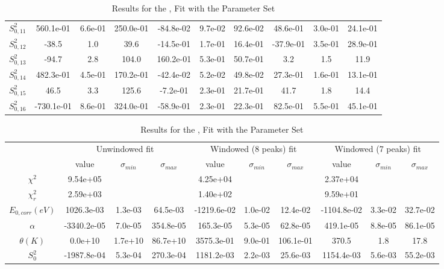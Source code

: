 \documentclass{article}
\begin{document}
\begin{landscape}
\begin{table}[ht]
\begin{tabular}{c|c|c|c|c|c|c|c|c|c}
$S^2_{0,11}$& 560.1e-01 & 6.6e-01 & 250.0e-01 & -84.8e-02 & 9.7e-02 & 92.6e-02 & 48.6e-01 & 3.0e-01 & 24.1e-01 \\
$S^2_{0,12}$& -38.5 & 1.0 & 39.6 & -14.5e-01 & 1.7e-01 & 16.4e-01 & -37.9e-01 & 3.5e-01 & 28.9e-01 \\
$S^2_{0,13}$& -94.7 & 2.8 & 104.0 & 160.2e-01 & 5.3e-01 & 50.7e-01 & 3.2 & 1.5 & 11.9 \\
$S^2_{0,14}$& 482.3e-01 & 4.5e-01 & 170.2e-01 & -42.4e-02 & 5.2e-02 & 49.8e-02 & 27.3e-01 & 1.6e-01 & 13.1e-01 \\
$S^2_{0,15}$& 46.5 & 3.3 & 125.6 & -7.2e-01 & 2.3e-01 & 21.7e-01 & 41.7 & 1.8 & 14.4 \\
$S^2_{0,16}$& -730.1e-01 & 8.6e-01 & 324.0e-01 & -58.9e-01 & 2.3e-01 & 22.3e-01 & 82.5e-01 & 5.5e-01 & 45.1e-01 \\
\hline
    \end{tabular}
    \caption{Results for the ,  Fit with the  Parameter Set}
\end{table}
\begin{table}[ht]
\centering
\begin{tabular}{c|c|c|c|c|c|c|c|c|c}
\hline
&\multicolumn{3}{|c}{Unwindowed fit}&\multicolumn{3}{|c}{Windowed (8 peaks) fit}&\multicolumn{3}{|c}{Windowed (7 peaks) fit}\\
& value & $\sigma_{min}$ & $\sigma_{max}$& value & $\sigma_{min}$ & $\sigma_{max}$& value & $\sigma_{min}$ & $\sigma_{max}$\\
\hline
$\chi^2$   & 9.54e+05 & & & 4.25e+04 & & & 2.37e+04 & & \\
$\chi^2_r$ & 2.59e+03 & & & 1.40e+02 & & & 9.59e+01 & & \\
\hline
$E_{0,corr} (eV)$& 1026.3e-03 & 1.3e-03 & 64.5e-03 & -1219.6e-02 & 1.0e-02 & 12.4e-02 & -1104.8e-02 & 3.3e-02 & 32.7e-02 \\
$\alpha $       & -3340.2e-05 & 7.0e-05 & 354.8e-05 & 165.3e-05 & 5.3e-05 & 62.8e-05 & 419.1e-05 & 8.8e-05 & 86.1e-05 \\
$\theta (K) $   & 0.0e+10 & 1.7e+10 & 86.7e+10 & 3575.3e-01 & 9.0e-01 & 106.1e-01 & 370.5 & 1.8 & 17.8 \\
$S^2_{0}$& -1987.8e-04 & 5.3e-04 & 270.3e-04 & 1181.2e-03 & 2.2e-03 & 25.6e-03 & 1154.4e-03 & 5.6e-03 & 55.2e-03 \\
\hline
    \end{tabular}
    \caption{Results for the ,  Fit with the  Parameter Set}
\end{table}
\end{landscape}
\end{document}
